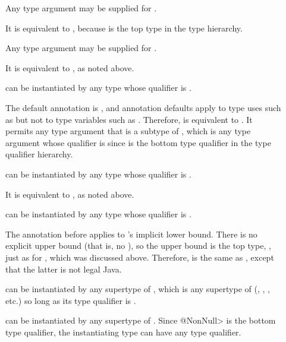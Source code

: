 \begin{description}
\item[]
  Any type argument may be supplied for .

  It is equivalent to , because
   is the top type in the type hierarchy.

\item[]
  Any type argument may be supplied for .

  It is equivalent to , as noted above.

\item[]
   can be instantiated by any type whose qualifier is .

  The default annotation is , and annotation defaults apply
  to type uses such as  but not to type variables such as
  .  Therefore,  is equivalent to
  .  It permits any type argument that is
  a subtype of , which is any type argument whose
  qualifier is  since  is the bottom type
  qualifier in the type qualifier hierarchy.

\item[]
   can be instantiated by any type whose qualifier is .

  It is equivalent to , as noted above.

\item[]
   can be instantiated by any type whose qualifier is .

  The annotation  before  applies to 's
  implicit lower bound.  There is no explicit upper bound (that is, no
  ), so the upper bound is the top type, , just as for , which was discussed above.  Therefore,
   is the same as , except that the latter is not legal Java.

\item[]
   can be instantiated by any supertype of ,
  which is any supertype of  (,
  , , etc.) so long as its type
  qualifier is .

\item[]
   can be instantiated by any supertype of .
  Since \<@NonNull> is the bottom type qualifier, the instantiating type
  can have any type qualifier.

\end{description}

